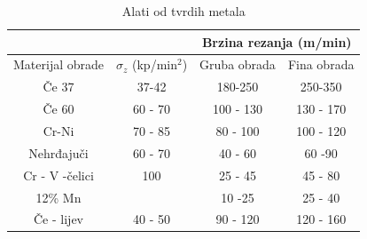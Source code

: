 \documentclass[a4paper,12pt]{article}
\numberwithin{figure}{section}
\begin{document}
\begin{table}[!h]
\centering
\caption{Alati od tvrdih metala}
\label{my-label}
\begin{tabular}{cc|c|c|}
\cline{3-4}
\multicolumn{1}{l}{}                   & \multicolumn{1}{l|}{}                    & \multicolumn{2}{c|}{Brzina rezanja (m/min)}                                  \\ \hline
\multicolumn{1}{|l|}{Materijal obrade} & \multicolumn{1}{l|}{$\sigma_{z}$ (kp/min$^{2}$)} & \multicolumn{1}{l|}{Gruba obrada} & \multicolumn{1}{l|}{Fina obrada} \\ \hline
\multicolumn{1}{|c|}{Če 37}            & 37-42                                    & 180-250                           & 250-350                          \\ \hline
\multicolumn{1}{|c|}{Če 60}            & 60 - 70                                  & 100 - 130                         & 130 - 170                        \\ \hline
\multicolumn{1}{|c|}{Cr-Ni}            & 70 - 85                                  & 80 - 100                          & 100 - 120                        \\ \hline
\multicolumn{1}{|c|}{Nehrđajuči}       & 60 - 70                                  & 40 - 60                           & 60 -90                           \\ \hline
\multicolumn{1}{|c|}{Cr - V -čelici}   & 100                                      & 25 - 45                           & 45 - 80                          \\ \hline
\multicolumn{1}{|c|}{12\% Mn}            &                                          & 10 -25                            & 25 - 40                          \\ \hline
\multicolumn{1}{|c|}{Če - lijev}       & 40 - 50                                  & 90 - 120                          & 120 - 160                        \\ \hline
\end{tabular}
\end{table}
\FloatBarrier
\end{document}
